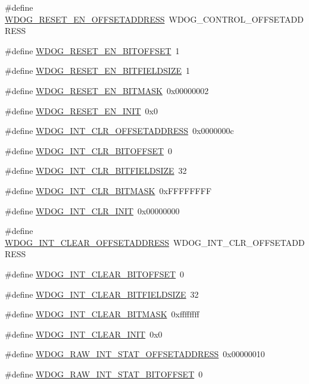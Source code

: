 \begin{DoxyCompactItemize}
\#define \hyperlink{a00577_ac800dfa9691b917382d38775182c8ba7}{WDOG\_\-RESET\_\-EN\_\-OFFSETADDRESS}~WDOG\_\-CONTROL\_\-OFFSETADDRESS
\item 
\#define \hyperlink{a00577_a350fa658cee30762ecb379708ab0dac8}{WDOG\_\-RESET\_\-EN\_\-BITOFFSET}~1
\item 
\#define \hyperlink{a00577_a6ce4df967a8e4a3c36378ad2e6f9483e}{WDOG\_\-RESET\_\-EN\_\-BITFIELDSIZE}~1
\item 
\#define \hyperlink{a00577_adca1717bfe0c5bc360f32e946f8bbdda}{WDOG\_\-RESET\_\-EN\_\-BITMASK}~0x00000002
\item 
\#define \hyperlink{a00577_a40ebf989268ec4d24b9940e7ccbc70f3}{WDOG\_\-RESET\_\-EN\_\-INIT}~0x0
\item 
\#define \hyperlink{a00577_afea286ed7d0b35e534e7eb2e814a933f}{WDOG\_\-INT\_\-CLR\_\-OFFSETADDRESS}~0x0000000c
\item 
\#define \hyperlink{a00577_a4b2ff35df7dfcb09af909944e03dfaa3}{WDOG\_\-INT\_\-CLR\_\-BITOFFSET}~0
\item 
\#define \hyperlink{a00577_a489d6069fd7795cf5695daa847b082b3}{WDOG\_\-INT\_\-CLR\_\-BITFIELDSIZE}~32
\item 
\#define \hyperlink{a00577_ab9bb8cd42e35bb16f4233ccb0bf63f4b}{WDOG\_\-INT\_\-CLR\_\-BITMASK}~0xFFFFFFFF
\item 
\#define \hyperlink{a00577_aa2a1b9bdf504b37b3f1d1a49da99d2b3}{WDOG\_\-INT\_\-CLR\_\-INIT}~0x00000000
\item 
\#define \hyperlink{a00577_a9c0e12573e926f3b188b01972d72c8ad}{WDOG\_\-INT\_\-CLEAR\_\-OFFSETADDRESS}~WDOG\_\-INT\_\-CLR\_\-OFFSETADDRESS
\item 
\#define \hyperlink{a00577_a2a86bf0a87fa3a56e5d54b47b6b25ea1}{WDOG\_\-INT\_\-CLEAR\_\-BITOFFSET}~0
\item 
\#define \hyperlink{a00577_af6b0e556d9f966864dcd7e2c7698dec6}{WDOG\_\-INT\_\-CLEAR\_\-BITFIELDSIZE}~32
\item 
\#define \hyperlink{a00577_aeda73ee35febffb7c0b08249b613d4d9}{WDOG\_\-INT\_\-CLEAR\_\-BITMASK}~0xffffffff
\item 
\#define \hyperlink{a00577_a7f1a1e366bad18c60ee0c2f2e35421cb}{WDOG\_\-INT\_\-CLEAR\_\-INIT}~0x0
\item 
\#define \hyperlink{a00577_a143eb710cceff0b34534b0fcab5ca6bc}{WDOG\_\-RAW\_\-INT\_\-STAT\_\-OFFSETADDRESS}~0x00000010
\item 
\#define \hyperlink{a00577_a69ac4ca2c2b71eec916b616351c6157f}{WDOG\_\-RAW\_\-INT\_\-STAT\_\-BITOFFSET}~0
\item 

\end{DoxyCompactItemize}
